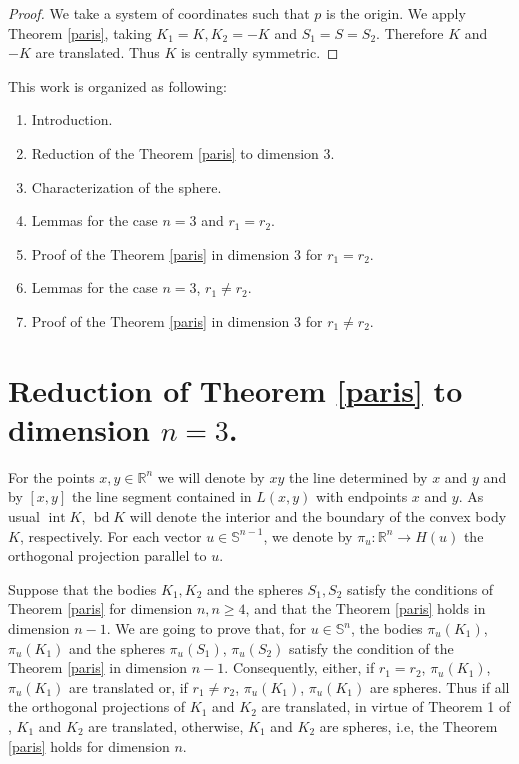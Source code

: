 \documentclass[12pt]{amsart}
\newcommand{\Rn}{\mathbb{R}^{n}}
\newcommand{\inte}{\operatorname*{int}}
\newcommand{\bd}{\operatorname*{bd}}
\begin{document}
\begin{proof}  
We take a system of coordinates such that $p$ is the origin. We apply Theorem \ref{paris}, taking $K_1=K, K_2=-K$ and $S_1=S=S_2$. Therefore $K$ and $-K$ are translated. Thus $K$ is centrally symmetric.  
\end{proof}  
 This work is organized as following:
\begin{enumerate}
\item Introduction.

\item Reduction of the Theorem \ref{paris} to dimension 3.

\item Characterization of the sphere.

\item Lemmas for the case $n=3$ and $r_{1}= r_{2}$. 

\item Proof of the Theorem \ref{paris} in dimension 3 for $r_1=r_2$. 

\item Lemmas for the case $n=3$, $r_{1}\not =r_{2}$.

 
\item Proof of the Theorem \ref{paris} in dimension 3  for $r_1\not=r_2$. 

\end{enumerate}
\section{Reduction of Theorem \ref{paris} to dimension $n=3$.}  
For the points $x,y \in \Rn$ we will denote by $xy$ the line determined by $x$ and $y$ and by $[x,y]$ the line segment contained in $L(x,y)$ with endpoints $x$ and $y$.  As usual $\inte K$, $\bd K$ will denote the interior and the boundary of the convex body $K$, respectively.  For each vector $u\in \mathbb{S}^{n-1}$, we denote by $\pi_u:\Rn \rightarrow H(u)$ the orthogonal projection parallel to $u$.


Suppose that the bodies $K_1,K_2$ and the spheres $S_1,S_2$ satisfy the conditions of Theorem \ref{paris} for dimension $n, n\geq 4$, and that the Theorem \ref{paris}
holds in dimension $n-1 $. We are going to prove that, for $u\in \mathbb{S}^{n}$, the bodies $\pi_u(K_1)$, $\pi_u(K_1)$ and the spheres $\pi_u(S_1)$, $\pi_u(S_2)$ satisfy the condition of the Theo\-rem \ref{paris} in dimension $n-1$. Consequently, either, if $r_1=r_2$, $\pi_u(K_1)$, $\pi_u(K_1)$ are translated or, if $r_1\not=r_2$, $\pi_u(K_1)$, $\pi_u(K_1)$ are spheres. Thus if all the orthogonal projections of $K_1$ and $K_2$  are translated, in virtue of Theorem 1 of \cite{ro1}, $K_1$ and $K_2$ are translated, otherwise, $K_1$ and $K_2$ are spheres, i.e, the Theorem \ref{paris} holds for dimension $n$.
\end{document}
